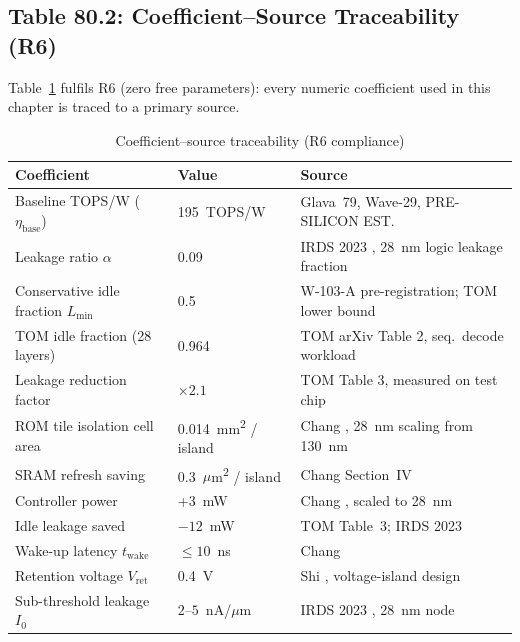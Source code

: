 \subsection{Table 80.2: Coefficient--Source Traceability (R6)}
\label{sec:coeff_table}

Table~\ref{tab:coefficients_sources} fulfils R6 (zero free parameters):
every numeric coefficient used in this chapter is traced to a primary
source.

\begin{table}[ht]
\centering
\caption{Coefficient--source traceability (R6 compliance)}
\label{tab:coefficients_sources}
\begin{tabular}{p{4.5cm}p{2.5cm}p{5.5cm}}
\hline
Coefficient & Value & Source \\
\hline
Baseline TOPS/W (\(\eta_{\mathrm{base}}\)) & 195~TOPS/W & Glava~79, Wave-29, PRE-SILICON EST. \\
Leakage ratio \(\alpha\) & 0.09 & IRDS 2023 \cite{irds2023}, 28~nm logic leakage fraction \\
Conservative idle fraction \(L_{\min}\) & 0.5 & W-103-A pre-registration; TOM \cite{tom_arxiv_2602} lower bound \\
TOM idle fraction (28 layers) & 0.964 & TOM arXiv \cite{tom_arxiv_2602} Table 2, seq.\ decode workload \\
Leakage reduction factor & \(\times 2.1\) & TOM \cite{tom_arxiv_2602} Table 3, measured on test chip \\
ROM tile isolation cell area & 0.014~mm\textsuperscript{2} / island & Chang \cite{chang_power_gating_2006}, 28~nm scaling from 130~nm \\
SRAM refresh saving & 0.3~\(\mu\)m\textsuperscript{2} / island & Chang \cite{chang_power_gating_2006} Section~IV \\
Controller power & +3~mW & Chang \cite{chang_power_gating_2006}, scaled to 28~nm \\
Idle leakage saved & \(-12\)~mW & TOM \cite{tom_arxiv_2602} Table~3; IRDS 2023 \cite{irds2023} \\
Wake-up latency \(t_{\mathrm{wake}}\) & \(\leq 10\)~ns & Chang \cite{chang_power_gating_2006} \\
Retention voltage \(V_{\mathrm{ret}}\) & 0.4~V & Shi \cite{shi_voltage_island_2014}, voltage-island design \\
Sub-threshold leakage \(I_0\) & \(2\)--\(5\)~nA/\(\mu\)m & IRDS 2023 \cite{irds2023}, 28~nm node \\
\hline
\end{tabular}
\end{table}

